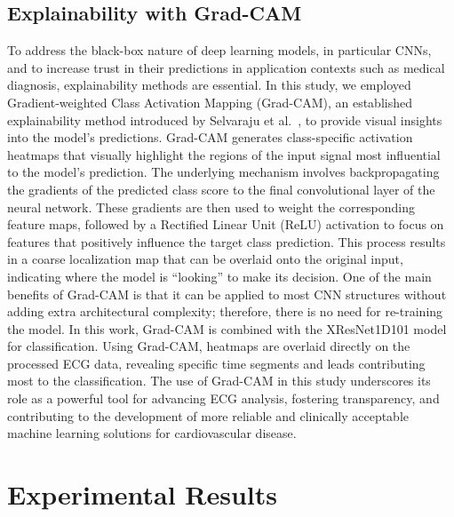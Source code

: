 \documentclass[a4paper,fleqn]{cas-dc}
\begin{document}
\subsection{Explainability with Grad-CAM}
To address the black-box nature of deep learning models, in particular CNNs, and to increase trust in their predictions in application contexts such as medical diagnosis, explainability methods are essential. In this study, we employed Gradient-weighted Class Activation Mapping (Grad-CAM), an established explainability method introduced by Selvaraju et al.~\cite{selvaraju2017grad}, to provide visual insights into the model's predictions. Grad-CAM generates class-specific activation heatmaps that visually highlight the regions of the input signal most influential to the model's prediction. The underlying mechanism involves backpropagating the gradients of the predicted class score to the final convolutional layer of the neural network. These gradients are then used to weight the corresponding feature maps, followed by a Rectified Linear Unit (ReLU) activation to focus on features that positively influence the target class prediction. This process results in a coarse localization map that can be overlaid onto the original input, indicating where the model is ``looking'' to make its decision. One of the main benefits of Grad-CAM is that it can be applied to most CNN structures without adding extra architectural complexity; therefore, there is no need for re-training the model. In this work, Grad-CAM is combined with the XResNet1D101 model for classification. Using Grad-CAM, heatmaps are overlaid directly on the processed ECG data, revealing specific time segments and leads contributing most to the classification. The use of Grad-CAM in this study underscores its role as a powerful tool for advancing ECG analysis, fostering transparency, and contributing to the development of more reliable and clinically acceptable machine learning solutions for cardiovascular disease.
\FloatBarrier

\section{Experimental Results}
\label{sec:results}
\end{document}
